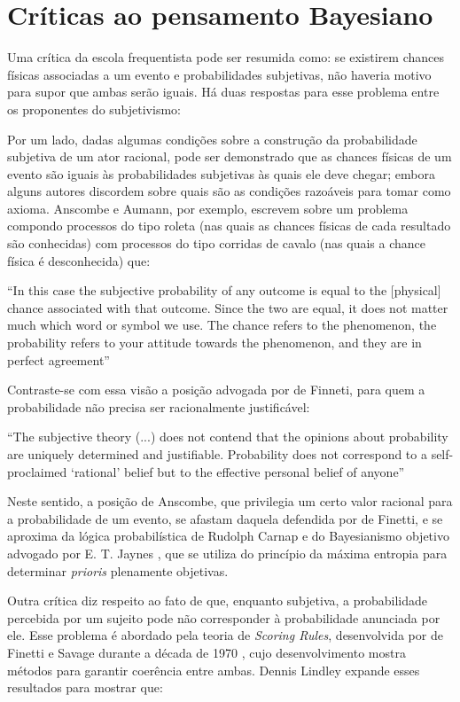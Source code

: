 \section{Críticas ao pensamento Bayesiano}

Uma crítica da escola frequentista pode ser resumida como: se existirem chances físicas associadas a um evento
e probabilidades subjetivas, não haveria motivo para supor que ambas serão iguais. Há duas respostas para esse problema 
entre os proponentes do subjetivismo:

Por um lado, dadas algumas condições sobre a construção da
probabilidade subjetiva de um ator racional, pode ser demonstrado que as chances físicas de um evento são iguais 
às probabilidades subjetivas às quais ele deve chegar; embora
alguns autores discordem sobre quais são as condições razoáveis para tomar como axioma. Anscombe e Aumann, por exemplo,
escrevem sobre um problema compondo processos do tipo roleta (nas quais as chances físicas de cada resultado são conhecidas) 
com processos do tipo corridas de cavalo (nas quais a chance física é desconhecida) que:

``In this case the subjective probability of any outcome is equal to the [physical] chance associated with that outcome.
Since the two are equal, it does not matter much which word or symbol we use. The
chance refers to the phenomenon, the probability refers to your attitude
towards the phenomenon, and they are in perfect agreement''\citep{Anscombe63}

Contraste-se com essa visão a posição advogada por de Finneti, para quem a probabilidade não precisa ser racionalmente
justificável:

``The subjective theory (...) does not contend that the opinions about probability are uniquely determined and
justifiable. Probability does not correspond to a self-proclaimed `rational' belief but to the effective personal
belief of anyone''\citep{deFinetti51}

Neste sentido, a posição de Anscombe, que privilegia um certo valor racional para a probabilidade de um evento,
se afastam daquela defendida por de Finetti, e se aproxima da lógica probabilística de Rudolph Carnap e do Bayesianismo
objetivo advogado por E. T. Jaynes \citep{Jaynes68}, que se utiliza do princípio da máxima entropia para determinar
{\em prioris} plenamente objetivas.

Outra crítica diz respeito ao fato de que, enquanto subjetiva, a probabilidade percebida por um sujeito pode não corresponder
à probabilidade anunciada por ele. Esse problema é abordado pela teoria de {\em Scoring Rules}, desenvolvida por
de Finetti e Savage durante a década de 1970 \citep{Lindley82}, cujo
desenvolvimento mostra métodos para garantir coerência entre ambas. Dennis Lindley expande esses resultados para mostrar que:

